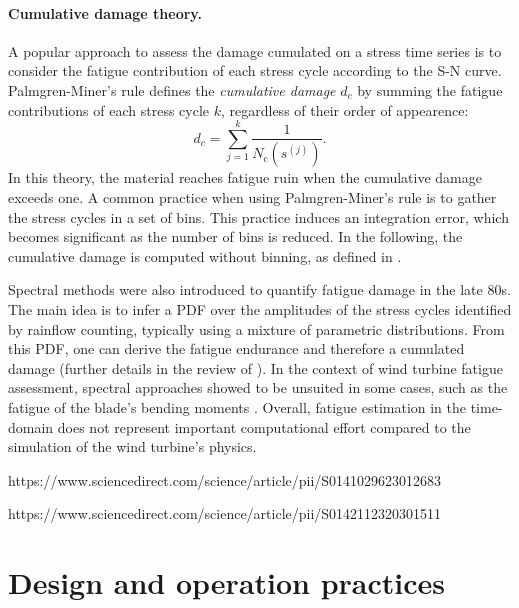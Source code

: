 \paragraph{Cumulative damage theory.}
A popular approach to assess the damage cumulated on a stress time series is to consider the fatigue contribution of each stress cycle according to the S-N curve. 
Palmgren-Miner's rule defines the \textit{cumulative damage} $d_c$ by summing the fatigue contributions of each stress cycle $k$, regardless of their order of appearence:
\begin{equation}
    d_c = \sum_{j=1}^{k} \frac{1}{N_{\mathrm{c}}\left(s^{(j)}\right)}.
    \label{eq:miner}
\end{equation}
In this theory, the material reaches fatigue ruin when the cumulative damage exceeds one.  
A common practice when using Palmgren-Miner's rule is to gather the stress cycles in a set of bins. 
This practice induces an integration error, which becomes significant as the number of bins is reduced. 
In the following, the cumulative damage is computed without binning, as defined in .


Spectral methods were also introduced to quantify fatigue damage in the late 80s. 
The main idea is to infer a PDF over the amplitudes of the stress cycles identified by rainflow counting, typically using a mixture of parametric distributions. 
From this PDF, one can derive the fatigue endurance and therefore a cumulated damage (further details in the review of \citet{dirlik_2021}). 
In the context of wind turbine fatigue assessment, spectral approaches showed to be unsuited in some cases, such as the fatigue of the blade's bending moments \citep{ragan_2007_dirlik_vs_miner}.  
Overall, fatigue estimation in the time-domain does not represent important computational effort compared to the simulation of the wind turbine's physics. 


https://www.sciencedirect.com/science/article/pii/S0141029623012683

https://www.sciencedirect.com/science/article/pii/S0142112320301511


\section{Design and operation practices} \label{sec:owt_design}

